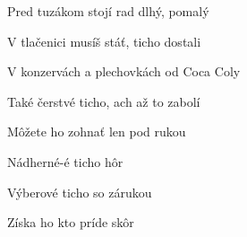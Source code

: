 \begin{song}
\bigskip

\Refren

\bigskip

 \par
{}Pred tuzákom stojí rad dlhý, pomalý \par
{}V tlačenici musíš stáť, ticho dostali \par
{}V konzervách a plechovkách od Coca Coly \par
{}Také čerstvé ticho, ach až to zabolí \par

\bigskip

Môžete ho zohnať len pod rukou \par
{}Nádherné-é ticho hôr \par
{}Výberové ticho  so zárukou \par
{}Získa ho kto príde skôr

\bigskip
\bigskip

\normalsize

 \ 
 \ 
 \ 
 \ 


\end{song}
